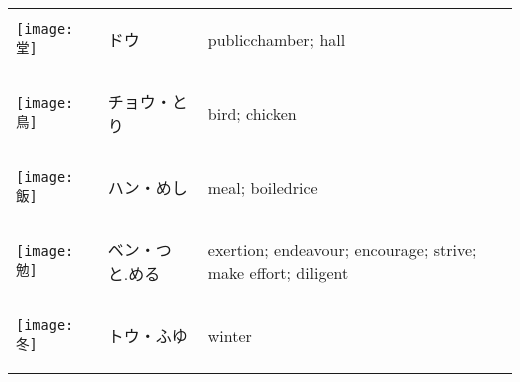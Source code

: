 \documentclass[a4paper,12pt]{extarticle}
\begin{document}
\begin{longtable}{|lp{6cm}p{4cm}|}
\begin{minipage}{0.3\textwidth}
\centerline{
	\texttt{[image: 堂]}
}
\end{minipage}
&
\begin{CJK}{UTF8}{min}ドウ\end{CJK}
&
publicchamber; hall
\\ 
\begin{minipage}{0.3\textwidth}
\centerline{
	\texttt{[image: 鳥]}
}
\end{minipage}
&
\begin{CJK}{UTF8}{min}チョウ・とり\end{CJK}
&
bird; chicken
\\ 
\begin{minipage}{0.3\textwidth}
\centerline{
	\texttt{[image: 飯]}
}
\end{minipage}
&
\begin{CJK}{UTF8}{min}ハン・めし\end{CJK}
&
meal; boiledrice
\\ 
\begin{minipage}{0.3\textwidth}
\centerline{
	\texttt{[image: 勉]}
}
\end{minipage}
&
\begin{CJK}{UTF8}{min}ベン・つと.める\end{CJK}
&
exertion; endeavour; encourage; strive; make effort; diligent
\\ 
\begin{minipage}{0.3\textwidth}
\centerline{
	\texttt{[image: 冬]}
}
\end{minipage}
&
\begin{CJK}{UTF8}{min}トウ・ふゆ\end{CJK}
&
winter
\\ 
\begin{minipage}{0.3\textwidth}

\end{minipage}
\end{longtable}
\end{document}
